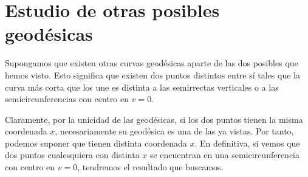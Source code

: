 \section{Estudio de otras posibles geodésicas}
Supongamos que existen otras curvas geodésicas aparte de las dos posibles que
hemos visto. Esto significa que existen dos puntos distintos entre sí tales que
la curva más corta que los une es distinta a las semirrectas verticales o  a las
semicircunferencias con centro en $v = 0$.

Claramente, por la unicidad de las geodésicas, si los dos puntos tienen la misma
coordenada $x$, necesariamente su geodésica es una de las ya vistas. Por tanto,
podemos suponer que tienen distinta coordenada $x$. En definitiva, si vemos que
dos puntos cualesquiera con distinta $x$ se encuentran en una semicircunferencia
con centro en $v = 0$, tendremos el resultado que buscamos.
